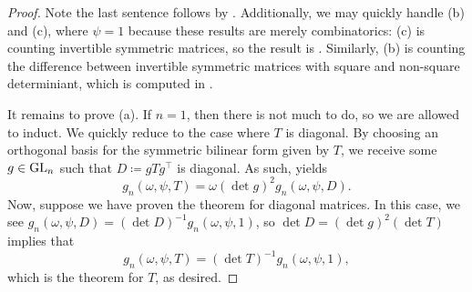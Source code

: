 \begin{proof}
    Note the last sentence follows by . Additionally, we may quickly handle (b) and (c), where $\psi=1$ because these results are merely combinatorics: (c) is counting invertible symmetric matrices, so the result is \cite[Theorem~7.5.2]{hach-gf}. Similarly, (b) is counting the difference between invertible symmetric matrices with square and non-square determiniant, which is computed in \cite[p.~163]{macwilliams-ortho-matrices}.
    
    It remains to prove (a). If $n=1$, then there is not much to do, so we are allowed to induct. We quickly reduce to the case where $T$ is diagonal. By choosing an orthogonal basis for the symmetric bilinear form given by $T$, we receive some $g\in\mathrm{GL}_n$ such that $D\coloneqq gTg^\intercal$ is diagonal. As such,  yields
    \[g_n(\omega,\psi,T) = \omega(\det g)^2g_n(\omega,\psi,D).\]
    Now, suppose we have proven the theorem for diagonal matrices. In this case, we see $g_n(\omega,\psi,D)=(\det D)^{-1}g_n(\omega,\psi,1)$, so $\det D=(\det g)^2(\det T)$ implies that
    \[g_n(\omega,\psi,T)=(\det T)^{-1}g_n(\omega,\psi,1),\]
    which is the theorem for $T$, as desired.


\end{proof}
